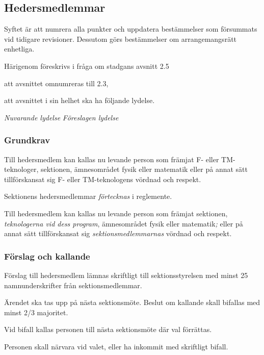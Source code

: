 \documentclass{article}
\newenvironment{lydelse}
    {\begin{paracol}{2}%
        \emph{Nuvarande lydelse}%
        \switchcolumn%
        \emph{Föreslagen lydelse}%
    \end{paracol}%
    \begin{enumerate}[label=\thesubsection.\arabic*]%
    \begin{paracol}{2}%
    }{\end{paracol}\end{enumerate}}
\newcommand{\itemb}{\item[\textbullet]}
\begin{document}
\setcounter{subsection}{2}
\subsection{Hedersmedlemmar}
Syftet är att numrera alla punkter och uppdatera bestämmelser som försummats vid tidigare revisioner.
Dessutom görs bestämmelser om arrangemangsrätt enhetliga.

Härigenom föreskrivs i fråga om stadgans avsnitt 2.5
\begin{dels}
    \item att avsnittet omnumreras till 2.3,
    \item att avsnittet i sin helhet ska ha följande lydelse.
\end{dels}

\begin{lydelse}%
    \subsubsection*{Grundkrav}
    \itemb Till hedersmedlem kan kallas nu levande person som främjat F- eller TM-tekno\-loger, sektionen, ämnesområdet fysik eller matematik eller på annat sätt till\-för\-skansat sig F- eller TM-tekno\-logens vördnad och respekt.
    \item[]
    
\switchcolumn
    \setcounter{subsection}{3}
    \item Sektionens hedersmedlemmar \emph{förtecknas} i reglemente.
    
    \item Till hedersmedlem kan kallas nu levande person som främjat sektionen, \emph{teknologerna vid dess program}, ämnesområdet fysik eller matematik\emph{;} eller på annat sätt till\-för\-skansat sig \emph{sektionsmedlemmarnas} vördnad och respekt.
    
\switchcolumn*
    \subsubsection*{Förslag och kallande}%
    \itemb Förslag till hedersmedlem lämnas skriftligt till sektionsstyrelsen med minst 25 namnunderskrifter från sektionsmedlemmar.

    \itemb Ärendet ska tas upp på nästa sektionsmöte. Beslut om kallande skall bifallas med minst 2/3 majoritet.
    
    \itemb Vid bifall kallas personen till nästa sektionsmöte där val förrättas.

    \itemb Personen skall närvara vid valet, eller ha inkommit med skriftligt bifall.


\end{lydelse}
\end{document}
